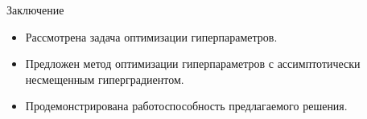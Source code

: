 \documentclass[aspectratio=169]{beamer}
\begin{document}



\begin{frame}{Заключение}
    \begin{itemize}
      \item Рассмотрена задача оптимизации гиперпараметров.
      \item Предложен метод оптимизации гиперпараметров с ассимптотически несмещенным гиперградиентом.
      \item Продемонстрирована работоспособность предлагаемого решения.
    \end{itemize}
\end{frame}

\end{document}
